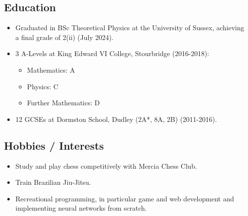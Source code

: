 \documentclass[11pt, a4paper, draft]{article}
\begin{document}
\subsection*{Education}
\begin{itemize}
    \item Graduated in BSc Theoretical Physics at the University of Sussex, achieving a final grade of 2(ii) (July 2024).
    \item 3 A-Levels at King Edward VI College, Stourbridge (2016-2018):
    \begin{itemize}
        \item Mathematics: A
        \item Physics: C
        \item Further Mathematics: D
    \end{itemize}
    \item 12 GCSEs at Dormston School, Dudley (2A*, 8A, 2B) (2011-2016).
\end{itemize}

\subsection*{Hobbies / Interests}
\begin{itemize}
    \item Study and play chess competitively with Mercia Chess Club.
    \item Train Brazilian Jiu-Jitsu.
    \item Recreational programming, in particular game and web development and implementing neural networks from scratch.
\end{itemize}
\end{document}
